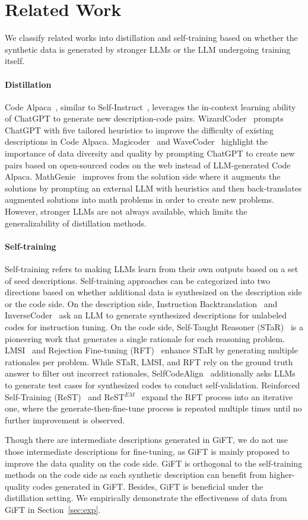 \section{Related Work}
We classify related works into distillation and self-training based on whether the synthetic data is generated by stronger LLMs or the LLM undergoing training itself.
\paragraph{Distillation}
Code Alpaca~\cite{codealpaca}, similar to Self-Instruct~\cite{selfinstruct}, leverages the in-context learning ability of ChatGPT to generate new description-code pairs. WizardCoder~\cite{wizardcoder} prompts ChatGPT with five tailored heuristics to improve the difficulty of existing descriptions in Code Alpaca. Magicoder~\cite{magicoder} and WaveCoder~\cite{wavecoder} highlight the importance of data diversity and quality by prompting ChatGPT to create new pairs based on open-sourced codes on the web instead of LLM-generated Code Alpaca. 
MathGenie~\cite{mathgenie} improves from the solution side where it augments the solutions by prompting an external LLM with heuristics and then back-translates augmented solutions into math problems in order to create new problems. However, stronger LLMs are not always available, which limits the generalizability of distillation methods.

\paragraph{Self-training}
Self-training refers to making LLMs learn from their own outputs based on a set of seed descriptions. Self-training approaches can be categorized into two directions based on whether additional data is synthesized on the description side or the code side. On the description side, Instruction Backtranslation~\cite{instruction-backtranslation} and InverseCoder~\cite{inversecoder} ask an LLM to generate synthesized descriptions for unlabeled codes for instruction tuning.
On the code side, Self-Taught Reasoner (STaR)~\cite{star} is a pioneering work that generates a single rationale for each reasoning problem. LMSI~\cite{lmsi} and Rejection Fine-tuning (RFT)~\cite{rft} enhance STaR by generating multiple rationales per problem. While STaR, LMSI, and RFT rely on the ground truth answer to filter out incorrect rationales, SelfCodeAlign~\cite{selfcodealign} additionally asks LLMs to generate test cases for synthesized codes to conduct self-validation. Reinforced Self-Training (ReST)~\cite{rest} and ReST$^{EM}$~\cite{restem} expand the RFT process into an iterative one, where the generate-then-fine-tune process is repeated multiple times until no further improvement is observed.

Though there are intermediate descriptions generated in GiFT, we do not use those intermediate descriptions for fine-tuning, as GiFT is mainly proposed to improve the data quality on the code side.
GiFT is orthogonal to the self-training methods on the code side as each synthetic description can benefit from higher-quality codes generated in GiFT. Besides, GiFT is beneficial under the distillation setting. We empirically demonstrate the effectiveness of data from GiFT in Section~\ref{sec:exp}.